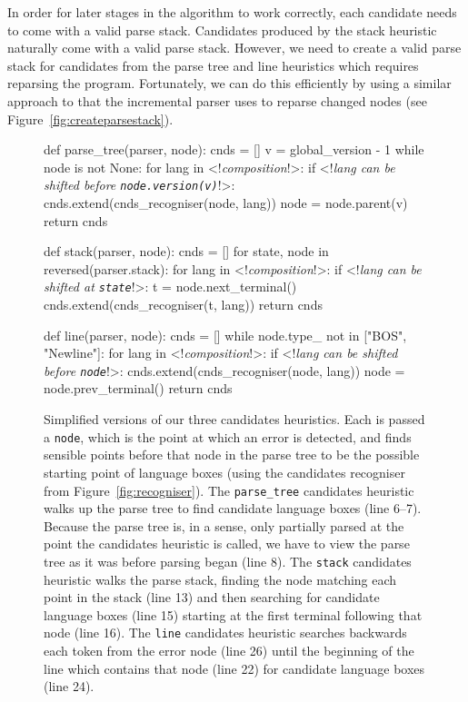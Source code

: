 \documentclass[sigplan,screen]{acmart}\settopmatter{printfolios=true,printccs=false,printacmref=false}
\begin{document}
In order for later stages in the algorithm to work correctly, each candidate
needs to come with a valid parse stack. Candidates produced by the stack
heuristic naturally come with a valid parse stack. However, we need to create a
valid parse stack for candidates from the parse tree and line heuristics which
requires reparsing the program. Fortunately, we can do this efficiently by
using a similar approach to that the incremental parser uses to reparse changed
nodes (see Figure~\ref{fig:createparsestack}).

\begin{figure}[t]
\begin{minipage}[t]{0.55\textwidth}
\begin{lstdefault}[]
def parse_tree(parser, node):
  cnds = []
  v = global_version - 1
  while node is not None:
    for lang in <!\textrm{\textit{composition}}!>:
      if <!\textrm{\textit{lang can be shifted before \texttt{node.version(v)}}}!>:
        cnds.extend(cnds_recogniser(node, lang))
    node = node.parent(v)
  return cnds

def stack(parser, node):
  cnds = []
  for state, node in reversed(parser.stack):
    for lang in <!\textrm{\textit{composition}}!>:
      if <!\textrm{\textit{lang can be shifted at \texttt{state}}}!>:
        t = node.next_terminal()
        cnds.extend(cnds_recogniser(t, lang))
  return cnds

def line(parser, node):
  cnds = []
  while node.type_ not in ["BOS", "Newline"]:
    for lang in <!\textrm{\textit{composition}}!>:
      if <!\textrm{\textit{lang can be shifted before \texttt{node}}}!>:
        cnds.extend(cnds_recogniser(node, lang))
    node = node.prev_terminal()
  return cnds
\end{lstdefault}
\end{minipage}
\begin{minipage}[t]{0.44\textwidth}
  \caption{Simplified versions of our three candidates heuristics. Each is
  passed a \texttt{node}, which is the point at which an error is detected, and
finds sensible points before that node in the parse tree to be the possible
starting point of language boxes (using the candidates recogniser from
Figure~\ref{fig:recogniser}).
The \texttt{parse\_tree} candidates heuristic
walks up the parse tree to find candidate language boxes (line 6--7).
Because the parse tree is, in a sense, only partially parsed at the point the
candidates heuristic is called, we have to view the parse tree as it was before parsing
began (line 8).
The \texttt{stack} candidates heuristic walks the parse
stack, finding the node matching each point in the stack (line 13) and then
searching for candidate language boxes (line 15) starting at the first terminal
following that node (line 16).
The \texttt{line} candidates heuristic searches
backwards each token from the error node (line 26) until the beginning of
the line which contains that node (line 22) for
candidate language boxes (line 24).}
\label{lst:find_candidates}
\end{minipage}
\end{figure}
\end{document}
